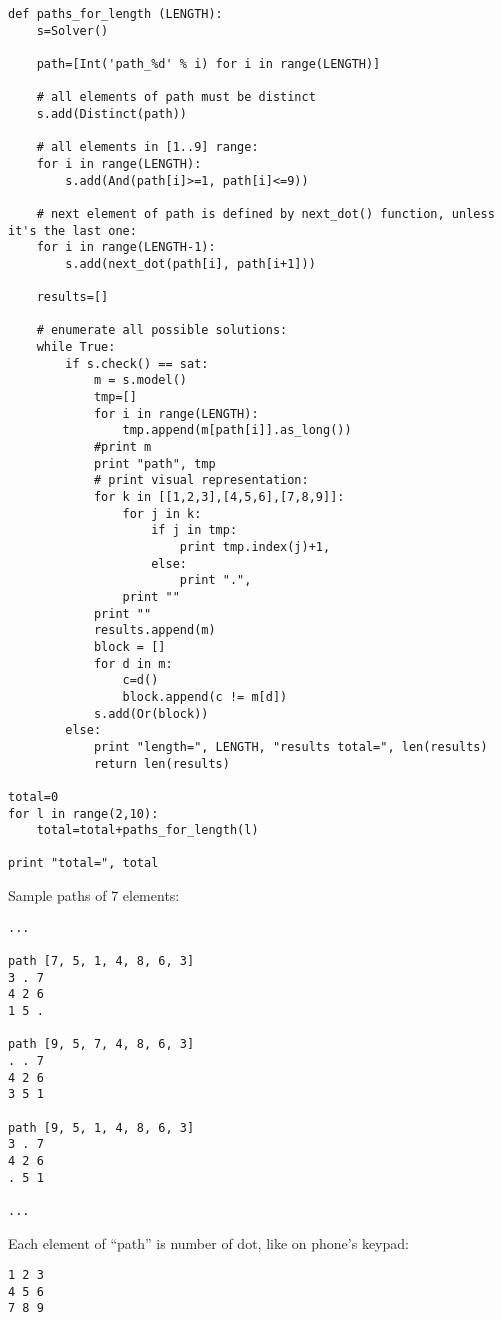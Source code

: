 \begin{lstlisting}
def paths_for_length (LENGTH):
    s=Solver()

    path=[Int('path_%d' % i) for i in range(LENGTH)]

    # all elements of path must be distinct
    s.add(Distinct(path))

    # all elements in [1..9] range:
    for i in range(LENGTH):
        s.add(And(path[i]>=1, path[i]<=9))

    # next element of path is defined by next_dot() function, unless it's the last one:
    for i in range(LENGTH-1):
        s.add(next_dot(path[i], path[i+1]))

    results=[]

    # enumerate all possible solutions:
    while True:
        if s.check() == sat:
            m = s.model()
            tmp=[]
            for i in range(LENGTH):
                tmp.append(m[path[i]].as_long())
            #print m
            print "path", tmp
            # print visual representation:
            for k in [[1,2,3],[4,5,6],[7,8,9]]:
                for j in k:
                    if j in tmp:
                        print tmp.index(j)+1,
                    else:
                        print ".",
                print ""
            print ""
            results.append(m)
            block = []
            for d in m:
                c=d()
                block.append(c != m[d])
            s.add(Or(block))
        else:
            print "length=", LENGTH, "results total=", len(results)
            return len(results)

total=0
for l in range(2,10):
    total=total+paths_for_length(l)

print "total=", total
\end{lstlisting}

Sample paths of 7 elements:

\begin{lstlisting}
...

path [7, 5, 1, 4, 8, 6, 3]
3 . 7
4 2 6
1 5 .

path [9, 5, 7, 4, 8, 6, 3]
. . 7
4 2 6
3 5 1

path [9, 5, 1, 4, 8, 6, 3]
3 . 7
4 2 6
. 5 1

...
\end{lstlisting}

Each element of ``path'' is number of dot, like on phone's keypad:

\begin{lstlisting}
1 2 3
4 5 6
7 8 9
\end{lstlisting}

